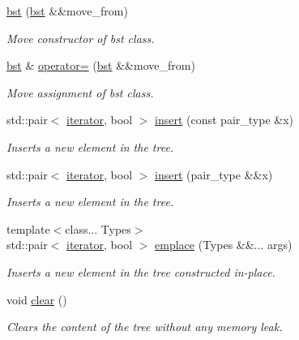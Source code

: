 \begin{DoxyCompactItemize}
\hyperlink{classbst_a853e031d8744ce2683fa545bc0347701}{bst} (\hyperlink{classbst}{bst} \&\&move\+\_\+from)
\begin{DoxyCompactList}\small\item\em Move constructor of bst class. \end{DoxyCompactList}\item 
\hyperlink{classbst}{bst} \& \hyperlink{classbst_a9f6886149564f901cae5664a44a05892}{operator=} (\hyperlink{classbst}{bst} \&\&move\+\_\+from)
\begin{DoxyCompactList}\small\item\em Move assignment of bst class. \end{DoxyCompactList}\item 
std\+::pair$<$ \hyperlink{classbst_a9378fa7f3f48ee62f3a0b4d168d8d98b}{iterator}, bool $>$ \hyperlink{classbst_ab0da8525e2a4dd0164f99101155f3707}{insert} (const pair\+\_\+type \&x)
\begin{DoxyCompactList}\small\item\em Inserts a new element in the tree. \end{DoxyCompactList}\item 
std\+::pair$<$ \hyperlink{classbst_a9378fa7f3f48ee62f3a0b4d168d8d98b}{iterator}, bool $>$ \hyperlink{classbst_aed4d2cf32e33be72fbe1c7887c215f88}{insert} (pair\+\_\+type \&\&x)
\begin{DoxyCompactList}\small\item\em Inserts a new element in the tree. \end{DoxyCompactList}\item 
{\footnotesize template$<$class... Types$>$ }\\std\+::pair$<$ \hyperlink{classbst_a9378fa7f3f48ee62f3a0b4d168d8d98b}{iterator}, bool $>$ \hyperlink{classbst_a39905be360bebca6156dacc16b5d0485}{emplace} (Types \&\&... args)
\begin{DoxyCompactList}\small\item\em Inserts a new element in the tree constructed in-\/place. \end{DoxyCompactList}\item 
\mbox{\label{classbst_a812f2e5948326bf3cd0034a01480fecf}} 
void \hyperlink{classbst_a812f2e5948326bf3cd0034a01480fecf}{clear} ()
\begin{DoxyCompactList}\small\item\em Clears the content of the tree without any memory leak. \end{DoxyCompactList}\item 

\end{DoxyCompactItemize}
